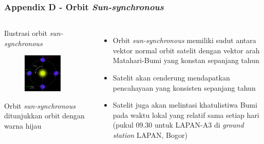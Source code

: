 \documentclass[8pt]{beamer}
\begin{document}
\begin{frame}
  \frametitle{Appendix D - Orbit \textit{Sun-synchronous}}
  \begin{columns}[T]
    \begin{block}{Ilustrasi orbit \textit{sun-synchronous}}
      \begin{figure}
          \includegraphics[width=0.8\textwidth]{figure/sso.png}
      \end{figure}
      Orbit \textit{sun-synchronous} ditunjukkan orbit dengan warna hijau
    \end{block}
    \begin{itemize}
      \item Orbit \textit{sun-synchronous} memiliki sudut antara vektor normal orbit satelit dengan vektor arah Matahari-Bumi yang konstan sepanjang tahun
      \item Satelit akan cenderung mendapatkan pencahayaan yang konsisten sepanjang tahun
      \item Satelit juga akan melintasi khatulistiwa Bumi pada waktu lokal yang relatif sama setiap hari (pukul 09.30 untuk LAPAN-A3 di \textit{ground station} LAPAN, Bogor)
    \end{itemize}
  \end{columns}
\end{frame}
\end{document}
